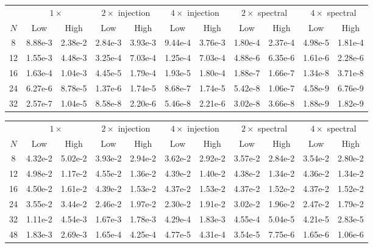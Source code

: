 \begin{table}[htpb]
\centering
\begin{tabular}{c|cc|cc|cc|cc|cc|}
 & \multicolumn{2}{c|}{$1 \times$} 
 & \multicolumn{2}{c|}{$2 \times$ \: injection}
 & \multicolumn{2}{c|}{$4 \times$ \: injection}
 & \multicolumn{2}{c|}{$2 \times$ \: spectral}
 & \multicolumn{2}{c|}{$4 \times$ \: spectral} \\
 $N$ & Low & High & Low & High & Low & High & Low & High & Low & High \\
 \hline
 8  & 8.88e-3 & 2.38e-2
    & 2.84e-3 & 3.93e-3
    & 9.44e-4 & 3.76e-3
    & 1.80e-4 & 2.37e-4
    & 4.98e-5 & 1.81e-4
    \\
 12 & 1.55e-3 & 4.48e-3
    & 3.25e-4 & 7.03e-4
    & 1.25e-4 & 7.03e-4
    & 4.88e-6 & 6.35e-6
    & 1.61e-6 & 2.28e-6
    \\
 16 & 1.63e-4 & 1.04e-3
    & 4.45e-5 & 1.79e-4
    & 1.93e-5 & 1.80e-4
    & 1.88e-7 & 1.66e-7 
    & 1.34e-8 & 3.71e-8
    \\
 24 & 6.27e-6 & 8.78e-5
    & 1.37e-6 & 1.74e-5
    & 8.68e-7 & 1.74e-5
    & 5.42e-8 & 1.06e-7
    & 4.58e-9 & 6.76e-9
    \\
 32 & 2.57e-7 & 1.04e-5
    & 8.58e-8 & 2.20e-6
    & 5.46e-8 & 2.21e-6
    & 3.02e-8 & 3.66e-8
    & 1.88e-9 & 1.82e-9
\end{tabular}

\begin{tabular}{c|cc|cc|cc|cc|cc|}
 & \multicolumn{2}{c|}{$1 \times$} 
 & \multicolumn{2}{c|}{$2 \times$ \: injection}
 & \multicolumn{2}{c|}{$4 \times$ \: injection}
 & \multicolumn{2}{c|}{$2 \times$ \: spectral}
 & \multicolumn{2}{c|}{$4 \times$ \: spectral} \\
 $N$ & Low & High & Low & High & Low & High & Low & High & Low & High \\
 \hline
 8  & 4.32e-2 & 5.02e-2
    & 3.93e-2 & 2.94e-2
    & 3.62e-2 & 2.92e-2
    & 3.57e-2 & 2.84e-2
    & 3.54e-2 & 2.80e-2
    \\
 12 & 4.98e-2 & 1.17e-2
    & 4.55e-2 & 1.36e-2
    & 4.39e-2 & 1.40e-2
    & 4.38e-2 & 1.34e-2
    & 4.36e-2 & 1.34e-2
    \\
 16 & 4.50e-2 & 1.61e-2
    & 4.39e-2 & 1.53e-2
    & 4.37e-2 & 1.53e-2
    & 4.37e-2 & 1.52e-2
    & 4.37e-2 & 1.52e-2
    \\
 24 & 3.55e-2 & 3.44e-2
    & 2.46e-2 & 1.97e-2
    & 2.30e-2 & 1.91e-2
    & 3.02e-2 & 1.96e-2
    & 2.47e-2 & 1.79e-2
    \\
 32 & 1.11e-2 & 4.54e-3
    & 1.67e-3 & 1.78e-3
    & 4.29e-4 & 1.83e-3
    & 4.55e-4 & 5.04e-5
    & 4.21e-5 & 2.83e-5
    \\
 48 & 1.83e-3 & 2.69e-3
    & 1.65e-4 & 4.25e-4
    & 4.77e-5 & 4.31e-4
    & 3.54e-5 & 7.75e-6
    & 1.65e-6 & 1.06e-6
\end{tabular}


\end{table}
